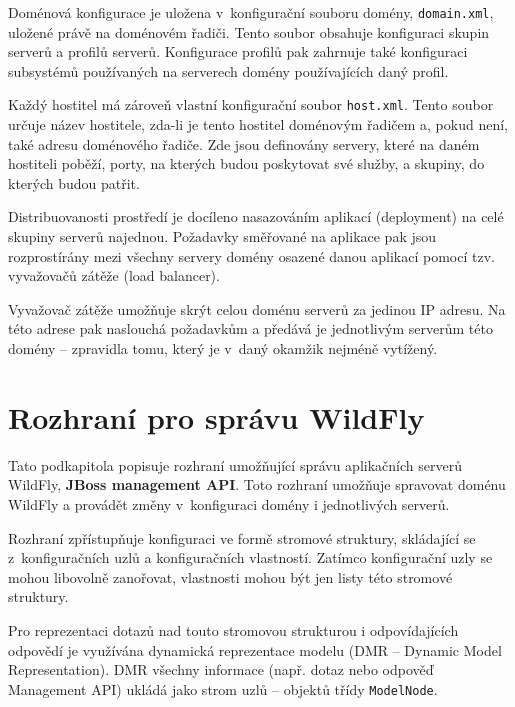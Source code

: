Doménová konfigurace je uložena v~konfigurační souboru domény, {\tt domain.xml}, uložené právě na doménovém řadiči.
Tento soubor obsahuje konfiguraci skupin serverů a profilů serverů.
Konfigurace profilů pak zahrnuje také konfiguraci subsystémů používaných na serverech domény používajících daný profil.
\cite{jbossDomainSetup}

Každý hostitel má zároveň vlastní konfigurační soubor {\tt host.xml}.
Tento soubor určuje název hostitele, zda-li je tento hostitel doménovým řadičem a, pokud není, také adresu doménového řadiče.
Zde jsou definovány servery, které na daném hostiteli poběží, porty, na kterých budou poskytovat své služby, a skupiny, do kterých budou patřit.
\cite{jbossDomainSetup}

Distribuovanosti prostředí je docíleno nasazováním aplikací (deployment) na celé skupiny serverů najednou.
Požadavky směřované na aplikace pak jsou rozprostírány mezi všechny servery domény osazené danou aplikací pomocí tzv. vyvažovačů zátěže (load balancer).
\cite{jbossLoadBalancing}

Vyvažovač zátěže umožňuje skrýt celou doménu serverů za jedinou IP adresu.
Na této adrese pak naslouchá požadavkům a předává je jednotlivým serverům této domény -- zpravidla tomu, který je v~daný okamžik nejméně vytížený.
\cite{jbossLoadBalancing}

\section{Rozhraní pro správu WildFly} \label{managementAPI}

Tato podkapitola popisuje rozhraní umožňující správu aplikačních serverů WildFly, {\bf JBoss management API}.
Toto rozhraní umožňuje spravovat doménu WildFly a provádět změny v~konfiguraci domény i jednotlivých serverů.
\cite{jbossDetypedManagement}

Rozhraní zpřístupňuje konfiguraci ve formě stromové struktury, skládající se z~konfiguračních uzlů a konfiguračních vlastností.
Zatímco konfigurační uzly se mohou libovolně zanořovat, vlastnosti mohou být jen listy této stromové struktury.
\cite{jbossDetypedManagement}

Pro reprezentaci dotazů nad touto stromovou strukturou i odpovídajících odpovědí je využívána dynamická reprezentace modelu (DMR -- Dynamic Model Representation).
DMR všechny informace (např. dotaz nebo odpověď Management API) ukládá jako strom uzlů -- objektů třídy {\tt ModelNode}.
\cite{jbossDetypedManagement}

